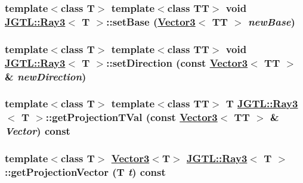 \hypertarget{class_j_g_t_l_1_1_ray3_61e6030f02fd3ba346634c808054962f}{
\subsubsection[setBase]{\setlength{\rightskip}{0pt plus 5cm}template$<$class T$>$ template$<$class TT$>$ void \hyperlink{class_j_g_t_l_1_1_ray3}{JGTL::Ray3}$<$ T $>$::set\-Base (\hyperlink{class_j_g_t_l_1_1_vector3}{Vector3}$<$ TT $>$ {\em new\-Base})}}
\label{class_j_g_t_l_1_1_ray3_61e6030f02fd3ba346634c808054962f}


\hypertarget{class_j_g_t_l_1_1_ray3_eaa2bcbd6fa914eab2c653e2053ce42b}{
\subsubsection[setDirection]{\setlength{\rightskip}{0pt plus 5cm}template$<$class T$>$ template$<$class TT$>$ void \hyperlink{class_j_g_t_l_1_1_ray3}{JGTL::Ray3}$<$ T $>$::set\-Direction (const \hyperlink{class_j_g_t_l_1_1_vector3}{Vector3}$<$ TT $>$ \& {\em new\-Direction})}}
\label{class_j_g_t_l_1_1_ray3_eaa2bcbd6fa914eab2c653e2053ce42b}


\hypertarget{class_j_g_t_l_1_1_ray3_a82c4c7c60beee84f42dae8329bafebd}{
\subsubsection[getProjectionTVal]{\setlength{\rightskip}{0pt plus 5cm}template$<$class T$>$ template$<$class TT$>$ T \hyperlink{class_j_g_t_l_1_1_ray3}{JGTL::Ray3}$<$ T $>$::get\-Projection\-TVal (const \hyperlink{class_j_g_t_l_1_1_vector3}{Vector3}$<$ TT $>$ \& {\em Vector}) const}}
\label{class_j_g_t_l_1_1_ray3_a82c4c7c60beee84f42dae8329bafebd}


\hypertarget{class_j_g_t_l_1_1_ray3_39b7bca999aefc20548add34db248989}{
\subsubsection[getProjectionVector]{\setlength{\rightskip}{0pt plus 5cm}template$<$class T$>$ \hyperlink{class_j_g_t_l_1_1_vector3}{Vector3}$<$T$>$ \hyperlink{class_j_g_t_l_1_1_ray3}{JGTL::Ray3}$<$ T $>$::get\-Projection\-Vector (T {\em t}) const}}
\label{class_j_g_t_l_1_1_ray3_39b7bca999aefc20548add34db248989}


